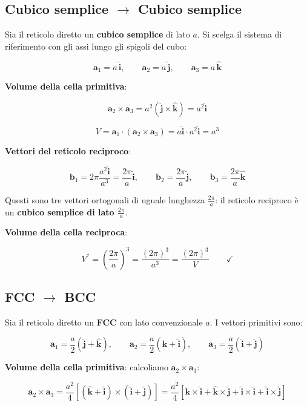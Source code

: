 \subsection*{Cubico semplice $\to$ Cubico semplice}

Sia il reticolo diretto un \textbf{cubico semplice} di lato $a$. Si scelga il sistema di riferimento con gli assi lungo gli spigoli del cubo:

$$\mathbf{a}_1 = a\,\hat{\mathbf{i}}, \qquad \mathbf{a}_2 = a\,\hat{\mathbf{j}}, \qquad \mathbf{a}_3 = a\,\hat{\mathbf{k}}$$

\textbf{Volume della cella primitiva}:

$$\mathbf{a}_2 \times \mathbf{a}_3 = a^2 (\hat{\mathbf{j}} \times \hat{\mathbf{k}}) = a^2 \hat{\mathbf{i}}$$

$$V = \mathbf{a}_1 \cdot (\mathbf{a}_2 \times \mathbf{a}_3) = a \hat{\mathbf{i}} \cdot a^2 \hat{\mathbf{i}} = a^3$$

\textbf{Vettori del reticolo reciproco}:

$$\mathbf{b}_1 = 2\pi \frac{a^2 \hat{\mathbf{i}}}{a^3} = \frac{2\pi}{a}\hat{\mathbf{i}}, \qquad \mathbf{b}_2 = \frac{2\pi}{a}\hat{\mathbf{j}}, \qquad \mathbf{b}_3 = \frac{2\pi}{a}\hat{\mathbf{k}}$$

Questi sono tre vettori ortogonali di uguale lunghezza $\frac{2\pi}{a}$: il reticolo reciproco è un \textbf{cubico semplice di lato $\frac{2\pi}{a}$}.

\textbf{Volume della cella reciproca}:

$$V^* = \left(\frac{2\pi}{a}\right)^3 = \frac{(2\pi)^3}{a^3} = \frac{(2\pi)^3}{V} \qquad \checkmark$$

\subsection*{FCC $\to$ BCC}

Sia il reticolo diretto un \textbf{FCC} con lato convenzionale $a$. I vettori primitivi sono:

$$\mathbf{a}_1 = \frac{a}{2}(\hat{\mathbf{j}} + \hat{\mathbf{k}}), \qquad \mathbf{a}_2 = \frac{a}{2}(\hat{\mathbf{k}} + \hat{\mathbf{i}}), \qquad \mathbf{a}_3 = \frac{a}{2}(\hat{\mathbf{i}} + \hat{\mathbf{j}})$$

\textbf{Volume della cella primitiva}: calcoliamo $\mathbf{a}_2 \times \mathbf{a}_3$:

$$\mathbf{a}_2 \times \mathbf{a}_3 = \frac{a^2}{4}\left[(\hat{\mathbf{k}} + \hat{\mathbf{i}}) \times (\hat{\mathbf{i}} + \hat{\mathbf{j}})\right] = \frac{a^2}{4}\left[\hat{\mathbf{k}} \times \hat{\mathbf{i}} + \hat{\mathbf{k}} \times \hat{\mathbf{j}} + \hat{\mathbf{i}} \times \hat{\mathbf{i}} + \hat{\mathbf{i}} \times \hat{\mathbf{j}}\right]$$

